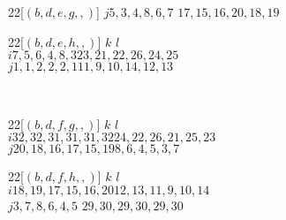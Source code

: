 \begin{example}
\begin{center}
\begin{game}{2}{2}[$(b,d,e,g,,)$]
	$j$\>$5,3,4,8,6,7$      \>$17,15,16,20,18,19$  
\end{game}
\hspace*{5mm}
\begin{game}{2}{2}[$(b,d,e,h,,)$]
	\>$k$            \>$l$ \\
	$i$\>$7,5,6,4,8,3$\>$23,21,22,26,24,25$\\
	$j$\>$1,1,2,2,2,1$\>$11,9,10,14,12,13$   
\end{game}
\\
\begin{game}{2}{2}[$(b,d,f,g,,)$]
	\>$k$                  \>$l$ \\
	$i$\>$32,32,31,31,31,32$\>$24,22,26,21,25,23$\\
	$j$\>$20,18,16,17,15,19$\>$8,6,4,5,3,7$        
\end{game}
\hspace*{5mm}
\begin{game}{2}{2}[$(b,d,f,h,,)$]
	\>$k$                  \>$l$ \\
	$i$\>$18,19,17,15,16,20$\>$12,13,11,9,10,14$\\
	$j$\>$3,7,8,6,4,5$      \>$29,30,29,30,29,30$  
\end{game}
\\
\vspace{-6mm}
\end{center}


\end{example}
